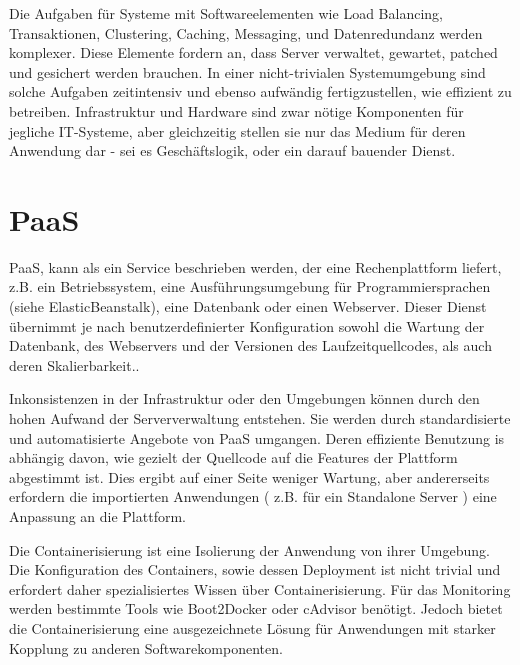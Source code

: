 \documentclass[
12pt,
english,
ngerman,
headsepline,
twoside,
openright,
numbers=noenddot,version=first
]{scrreprt}
\begin{document}
Die Aufgaben\label{sec:iaas-aufgaben} für Systeme mit Softwareelementen wie Load Balancing, Transaktionen, Clustering, Caching, Messaging, und Datenredundanz werden komplexer. Diese Elemente fordern an, dass Server verwaltet, gewartet, patched und gesichert werden brauchen. In einer nicht-trivialen Systemumgebung sind solche Aufgaben zeitintensiv und ebenso aufwändig fertigzustellen, wie effizient zu betreiben. Infrastruktur und Hardware sind zwar nötige Komponenten für jegliche IT-Systeme, aber gleichzeitig stellen sie nur das Medium für deren Anwendung dar - sei es Geschäftslogik, oder ein darauf bauender Dienst.

\section{PaaS}
\label{sec:paas}
\acrfull{PaaS}, kann als ein Service beschrieben werden, der eine Rechenplattform liefert, z.B. ein Betriebssystem, eine Ausführungsumgebung für Programmiersprachen (siehe ElasticBeanstalk), eine Datenbank oder einen Webserver. Dieser Dienst übernimmt je nach benutzerdefinierter Konfiguration sowohl die Wartung der Datenbank, des Webservers und der Versionen des Laufzeitquellcodes, als auch deren Skalierbarkeit.\cite{patternAWS}.


Inkonsistenzen in der Infrastruktur oder den Umgebungen können durch den hohen Aufwand der Serververwaltung entstehen. Sie werden durch standardisierte und automatisierte Angebote von \acrshort{PaaS} umgangen. Deren effiziente Benutzung is abhängig davon, wie gezielt der Quellcode auf die Features der Plattform abgestimmt ist. Dies ergibt auf einer Seite weniger Wartung, aber andererseits erfordern die importierten Anwendungen ( z.B. für ein Standalone Server ) eine Anpassung an die Plattform.

Die Containerisierung\label{par:containerisation} ist eine Isolierung der Anwendung von ihrer Umgebung. Die Konfiguration des Containers, sowie dessen Deployment ist nicht trivial und erfordert daher spezialisiertes Wissen über Containerisierung. Für das Monitoring werden bestimmte Tools wie Boot2Docker \cite{Boot2Docker} oder cAdvisor \cite{cAdvisor} benötigt. Jedoch bietet die Containerisierung eine ausgezeichnete Lösung für Anwendungen mit starker Kopplung zu anderen Softwarekomponenten.\cite{patternAWS}

\end{document}
